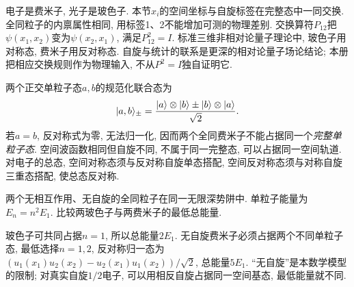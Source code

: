 电子是费米子, 光子是玻色子. 本节$x_i$的空间坐标与自旋标签在完整态中一同交换. 全同粒子的内禀属性相同, 用标签1、2不能增加可测的物理差别. 交换算符$P_{12}$把$\psi(x_1,x_2)$变为$\psi(x_2,x_1)$, 满足$P_{12}^2=I$. 标准三维非相对论量子理论中, 玻色子用对称态, 费米子用反对称态. 自旋与统计的联系是更深的相对论量子场论结论; 本册把相应交换规则作为物理输入, 不从$P^2=I$独自证明它.

两个正交单粒子态$a,b$的规范化联合态为
\[
\lvert a,b\rangle_\pm=\frac{\lvert a\rangle\otimes\lvert b\rangle\pm\lvert b\rangle\otimes\lvert a\rangle}{\sqrt2}.
\]
若$a=b$, 反对称式为零, 无法归一化, 因而两个全同费米子不能占据同一个\emph{完整单粒子态}. 空间波函数相同但自旋不同, 不属于同一完整态, 可以占据同一空间轨道. 对电子的总态, 空间对称态须与反对称自旋单态搭配, 空间反对称态须与对称自旋三重态搭配, 使总态反对称.

\begin{example}
两个无相互作用、无自旋的全同粒子在同一无限深势阱中. 单粒子能量为$E_n=n^2E_1$. 比较两玻色子与两费米子的最低总能量.
\end{example}
\begin{solution}
玻色子可共同占据$n=1$, 所以总能量$2E_1$. 无自旋费米子必须占据两个不同单粒子态, 最低选择$n=1,2$, 反对称归一态为$(u_1(x_1)u_2(x_2)-u_2(x_1)u_1(x_2))/\sqrt2$, 总能量$5E_1$. “无自旋”是本数学模型的限制; 对真实自旋$1/2$电子, 可以用相反自旋占据同一空间基态, 最低能量就不同.
\end{solution}

